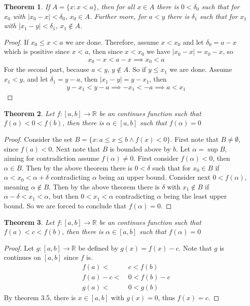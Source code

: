 \documentclass{article}
\theoremstyle{plain}
\newtheorem{theorem}{Theorem}
\theoremstyle{definition}
\begin{document}
\begin{theorem}
	If $A = \{x: x < a\}$, then for all $x \in A$ there is $0<\delta_0$ such 
	that for $x_0$ with $|x_0 - x| < \delta_0$, $x_0 \in A$. Further more, for 
	$a < y$ there is $\delta_1$ such that for $x_1$ with $|x_1-y| < \delta_1$,
	$x_1 \notin A$.
\end{theorem}
\begin{proof}
	If $x_0 \leq x < a$ we are done. Therefore, assume $x < x_0$ and let 
	$\delta_0 = a-x$ which is positive since $x < a$, then since $x < x_0$ we
	have $|x_0-x| = x_0-x$, so
	\begin{align*}
		x_0-x<a-x \implies x_0 < a
	\end{align*}
	For the second part, because $a < y$, $y \notin A$. So if $y \leq x_1$ we
	are done. Assume $x_1 < y$, and let $\delta_1 = y-a$, then $|x_1-y| =
	y-x_1$, then
	\begin{align*}
		y-x_1<y-a \implies -x_1 < -a \implies a < x_1
\end{align*}
\end{proof}
\begin{theorem}
	Let $f: [a,b] \rightarrow \mathbb{R}$ be an continues function such that
	$f(a) < 0 < f(b)$, then there is $\alpha \in [a,b]$ such that $f(\alpha) =
	0$
\end{theorem}
\begin{proof}
	Consider the set $B = \{x:a \leq x \leq b \land f(x) < 0\}$. First note that
	$B \neq \emptyset$, since $f(a) < 0$. Next note that $B$ is bounded above by
	$b$. Let $\alpha = \sup B$, aiming for contradiction assume $f(\alpha)
	\neq 0$. First consider $f(\alpha) < 0$, then $\alpha \in B$. Then by the
	above theorem there is $0 < \delta$ such that for $x_0\in B$ if $\alpha 
	< x_0 < \alpha + \delta$ contradicting $\alpha$ being an upper bound.
	Consider next $0 < f(\alpha)$, meaning $\alpha \notin B$. Then by the above 
	theorem there is $\delta$ with $x_1 \notin B$ if $\alpha - \delta < x_1 < 
	\alpha$, but then $0 < x_1 < \alpha$ contradicting $\alpha$ being the least 
	upper bound. So we are forced to conclude that $f(\alpha) = 0$.
\end{proof}
\begin{theorem}
	Let $f: [a,b] \rightarrow \mathbb{R}$ be an continues function such that
	$f(a) < c < f(b)$, then there is $\alpha \in [a,b]$ such that $f(\alpha) =
	0$
\end{theorem}
\begin{proof}
	Let $g: [a,b] \rightarrow \mathbb{R}$ be defined by $g(x) = f(x)-c$. Note
	that $g$ is continues on $[a,b]$ since $f$ is. 
	\begin{align*}
		f(a) <&\ c < f(b) \\
			f(a) - c <&\ 0 < f(b) - c \\
			g(a) <&\ 0 < g(b)
	\end{align*}
	By theorem 3.5, there is $x \in [a,b]$ with $g(x)=0$, thus $f(x)=c$.
\end{proof}
\end{document}
